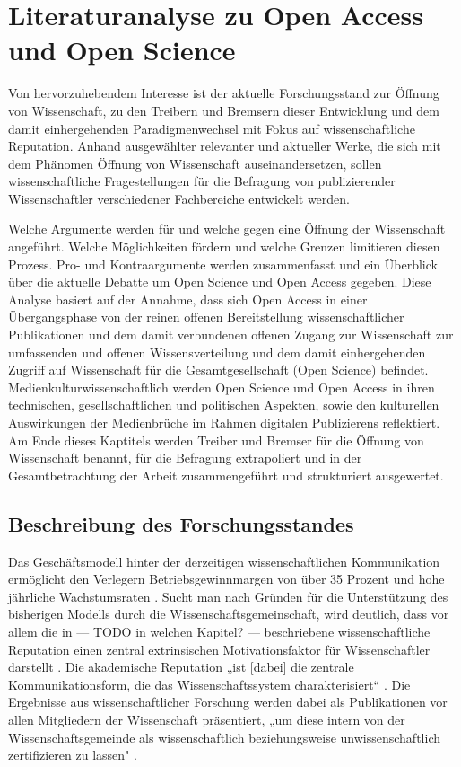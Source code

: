 \chapter{Literaturanalyse zu Open Access und Open Science}
Von hervorzuhebendem Interesse ist der aktuelle Forschungsstand zur Öffnung von Wissenschaft, zu den Treibern und Bremsern dieser Entwicklung und dem damit einhergehenden Paradigmenwechsel mit Fokus auf wissenschaftliche Reputation. Anhand ausgewählter relevanter und aktueller Werke, die sich mit dem Phänomen Öffnung von Wissenschaft auseinandersetzen, sollen wissenschaftliche Fragestellungen für die Befragung von publizierender Wissenschaftler verschiedener Fachbereiche entwickelt werden.

Welche Argumente werden für und welche gegen eine Öffnung der Wissenschaft angeführt. Welche Möglichkeiten fördern und welche Grenzen limitieren diesen Prozess. Pro- und Kontraargumente werden zusammenfasst und ein Überblick über die aktuelle Debatte um Open Science und Open Access gegeben. Diese Analyse basiert auf der Annahme, dass sich Open Access in einer Übergangsphase von der reinen offenen Bereitstellung wissenschaftlicher Publikationen und dem damit verbundenen offenen Zugang zur Wissenschaft zur umfassenden und offenen Wissensverteilung und dem damit einhergehenden Zugriff auf Wissenschaft für die Gesamtgesellschaft (Open Science) befindet. Medienkulturwissenschaftlich werden Open Science und Open Access in ihren technischen, gesellschaftlichen und politischen Aspekten, sowie den kulturellen Auswirkungen der Medienbrüche im Rahmen digitalen Publizierens reflektiert. Am Ende dieses Kaptitels werden Treiber und Bremser für die Öffnung von Wissenschaft benannt, für die Befragung extrapoliert und in der Gesamtbetrachtung der Arbeit zusammengeführt und strukturiert ausgewertet.

\section{Beschreibung des Forschungsstandes}
Das Geschäftsmodell hinter der derzeitigen wissenschaftlichen Kommunikation ermöglicht den Verlegern Betriebsgewinnmargen von über 35 Prozent \cite{russell_2008_business} und hohe jährliche Wachstumsraten \cite{Wellcome_Trust_2003}. Sucht man nach Gründen für die Unterstützung des bisherigen Modells durch die Wissenschaftsgemeinschaft, wird deutlich, dass vor allem die in --- TODO in welchen Kapitel? --- beschriebene wissenschaftliche Reputation einen zentral extrinsischen Motivationsfaktor für Wissenschaftler darstellt \cite{minssen_2012_arbeit}. Die akademische Reputation „ist [dabei] die zentrale Kommunikationsform, die das Wissenschaftssystem charakterisiert“ \cite{Rutenfranz_1997}. Die Ergebnisse aus wissenschaftlicher Forschung werden dabei als Publikationen vor allen Mitgliedern der Wissenschaft präsentiert, „um diese intern von der Wissenschaftsgemeinde als wissenschaftlich beziehungsweise unwissenschaftlich zertifizieren zu lassen" \cite{Rutenfranz_1997}.

